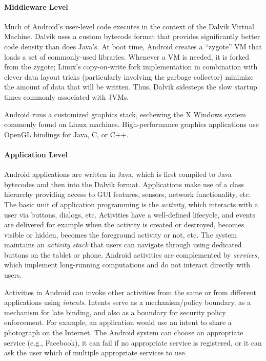 \paragraph{Middleware Level}

Much of Android's user-level code executes in the context of the
Dalvik Virtual Machine.
%
Dalvik uses a custom bytecode format that provides significantly
better code density than does Java's.
%
At boot time, Android creates a ``zygote'' VM that loads a set of
commonly-used libraries.
%
Whenever a VM is needed, it is forked from the zygote; Linux's
copy-on-write fork implementation in combination with clever data
layout tricks (particularly involving the garbage collector) minimize
the amount of data that will be written.
%
Thus, Dalvik sidesteps the slow startup times commonly
associated with JVMs\@.


Android runs a customized graphics stack, eschewing the X Windows
system commonly found on Linux machines.
%
High-performance graphics applications use OpenGL bindings for 
Java, C, or C++.


\paragraph{Application Level}

Android applications are written in Java, which is first compiled to
Java bytecodes and then into the Dalvik format.
%
Applications make use of a class hierarchy providing access to 
GUI features, sensors, network functionality, etc.
%
The basic unit of application programming is the \emph{activity},
which interacts with a user via buttons, dialogs, etc.
%
Activities have a well-defined lifecycle, and events are delivered for
example when the activity is created or destroyed, becomes visible or
hidden, becomes the foreground activity or not, etc.
%
The system maintains an \emph{activity stack} that users can navigate
through using dedicated buttons on the tablet or phone.
%
Android activities are complemented by \emph{services}, which
implement long-running computations and do not interact directly with
users.


Activities in Android can invoke other activities from the same
or from different applications using \emph{intents}.
%
Intents serve as a mechanism/policy boundary, as a mechanism for late
binding, and also as a boundary for security policy enforcement.
%
For example, an application would use an intent to share a
photograph on the Internet.
%
The Android system can choose an appropriate service (e.g., Facebook),
it can fail if no appropriate service is registered, or it can ask the
user which of multiple appropriate services to use.


